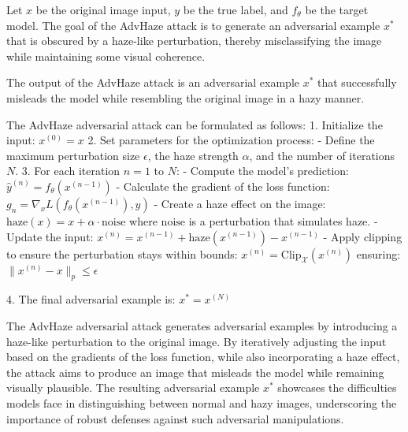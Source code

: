 Let \( x \) be the original image input, \( y \) be the true label, and \( f_{\theta} \) be the target model. The goal of the AdvHaze attack is to generate an adversarial example \( x^* \) that is obscured by a haze-like perturbation, thereby misclassifying the image while maintaining some visual coherence.

The output of the AdvHaze attack is an adversarial example \( x^* \) that successfully misleads the model while resembling the original image in a hazy manner.

The AdvHaze adversarial attack can be formulated as follows:
1. Initialize the input:
   $x^{(0)} = x$
2. Set parameters for the optimization process:
   - Define the maximum perturbation size \( \epsilon \), the haze strength \( \alpha \), and the number of iterations \( N \).
3. For each iteration \( n = 1 \) to \( N \):
   - Compute the model's prediction:
   $\hat{y}^{(n)} = f_{\theta}(x^{(n-1)})$
   - Calculate the gradient of the loss function:
   $g_n = \nabla_x L(f_{\theta}(x^{(n-1)}), y)$
   - Create a haze effect on the image:
   $\text{haze}(x) = x + \alpha \cdot \text{noise}$
   where \(\text{noise}\) is a perturbation that simulates haze.
   - Update the input:
   $x^{(n)} = x^{(n-1)} + \text{haze}(x^{(n-1)}) - x^{(n-1)}$
   - Apply clipping to ensure the perturbation stays within bounds:
   $x^{(n)} = \text{Clip}_{\mathcal{X}}(x^{(n)})$
   ensuring:
   $\|x^{(n)} - x\|_p \leq \epsilon$

4. The final adversarial example is:
   $x^* = x^{(N)}$

The AdvHaze adversarial attack generates adversarial examples by introducing a haze-like perturbation to the original image. By iteratively adjusting the input based on the gradients of the loss function, while also incorporating a haze effect, the attack aims to produce an image that misleads the model while remaining visually plausible. The resulting adversarial example \( x^* \) showcases the difficulties models face in distinguishing between normal and hazy images, underscoring the importance of robust defenses against such adversarial manipulations.
